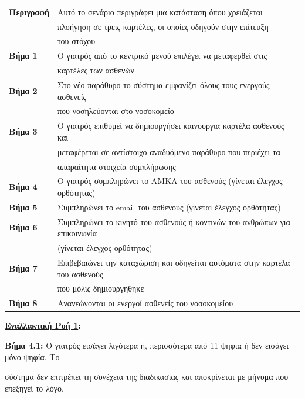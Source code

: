 \documentclass{article}
\newcommand\T{\rule{0pt}{2.6ex}}       %
\newcommand\B{\rule[-1.2ex]{0pt}{0pt}}
\begin{document}
  \begin{center}
     \begin{tabular}{|l|l|}
     \hline
      \textbf{Περιγραφή} & Αυτό το σενάριο περιγράφει μια κατάσταση όπου χρειάζεται \T \\& πλοήγηση σε τρεις καρτέλες, οι οποίες οδηγούν στην επίτευξη \\& του στόχου \B \\ 
      \hline
      \textbf{Βήμα 1} & Ο γιατρός από το κεντρικό μενού επιλέγει να μεταφερθεί στις \T \\& καρτέλες των ασθενών \B \\
      \hline
      \textbf{Βήμα 2} & Στο νέο παράθυρο το σύστημα εμφανίζει όλους τους ενεργούς ασθενείς
      \T \\& που νοσηλεύονται στο νοσοκομείο \B\\
      \hline
      \textbf{Βήμα 3} & Ο γιατρός επιθυμεί να δημιουργήσει καινούργια καρτέλα ασθενούς και \T \\& μεταφέρεται σε αντίστοιχο αναδυόμενο παράθυρο που περιέχει τα \\& απαραίτητα στοιχεία συμπλήρωσης \B \\
      \hline
      \textbf{Βήμα 4} & Ο γιατρός συμπληρώνει το ΑΜΚΑ του ασθενούς (γίνεται έλεγχος ορθότητας) \T\B \\
      \hline
      \textbf{Βήμα 5} & Συμπληρώνει το email του ασθενούς (γίνεται έλεγχος ορθότητας) \T\B \\
      \hline
      \textbf{Βήμα 6} & Συμπληρώνει το κινητό του ασθενούς ή κοντινών του ανθρώπων για επικοινωνία \T \\& (γίνεται έλεγχος ορθότητας) \B \\
      \hline
      \textbf{Βήμα 7} & Επιβεβαιώνει την καταχώριση και οδηγείται αυτόματα στην καρτέλα του ασθενούς \T \\& που μόλις δημιουργήθηκε \B \\
      \hline
      \textbf{Βήμα 8} & Ανανεώνονται οι ενεργοί ασθενείς του νοσοκομείου \T\B \\
      \hline
     \end{tabular}
 \end{center}
 
 \textbf{\underline{Εναλλακτική Ροή 1}:} \vspace{0.2cm}
\par \textbf{Βήμα 4.1:} Ο γιατρός εισάγει λιγότερα ή, περισσότερα από 11 ψηφία ή δεν εισάγει μόνο ψηφία. Το \par σύστημα δεν επιτρέπει τη συνέχεια της διαδικασίας και αποκρίνεται με μήνυμα που επεξηγεί το λόγο.  \vspace{0.2cm}
\end{document}
